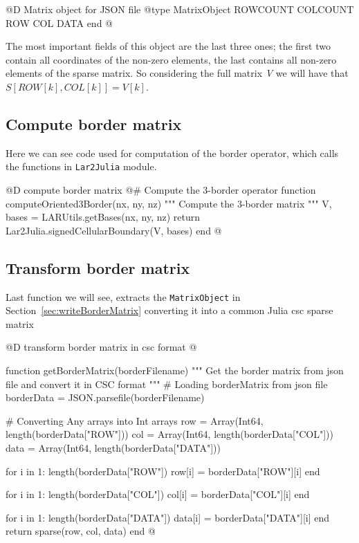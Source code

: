 \documentclass[11pt,oneside]{article}	%
\begin{document}
@D Matrix object for JSON file
@{type MatrixObject
  ROWCOUNT
  COLCOUNT
  ROW
  COL
  DATA
end @}

The most important fields of this object are the last three ones; the first two contain all coordinates of the non-zero elements, the last contains all non-zero elements of the sparse matrix. So considering the full matrix \textit{V} we will have that $S[ROW[k], COL[k]] = V[k]$.

\subsection{Compute border matrix}\label{sec:computeBorder}

Here we can see code used for computation of the border operator, which calls the functions in \texttt{Lar2Julia} module.

@D compute border matrix
@{# Compute the 3-border operator
function computeOriented3Border(nx, ny, nz)
  """
  Compute the 3-border matrix
  """
  V, bases = LARUtils.getBases(nx, ny, nz)
  return Lar2Julia.signedCellularBoundary(V, bases)
end @}

\subsection{Transform border matrix}\label{sec:transformBorder}

Last function we will see, extracts the \texttt{MatrixObject} in Section~\ref{sec:writeBorderMatrix} converting it into a common Julia csc sparse matrix

@D transform border matrix in csc format
@{function getBorderMatrix(borderFilename)
  """
  Get the border matrix from json file and convert it in
  CSC format
  """
  # Loading borderMatrix from json file
  borderData = JSON.parsefile(borderFilename)
  
  # Converting Any arrays into Int arrays
  row = Array(Int64, length(borderData["ROW"]))
  col = Array(Int64, length(borderData["COL"]))
  data = Array(Int64, length(borderData["DATA"]))

  for i in 1: length(borderData["ROW"])
    row[i] = borderData["ROW"][i]
  end

  for i in 1: length(borderData["COL"])
    col[i] = borderData["COL"][i]
  end

  for i in 1: length(borderData["DATA"])
    data[i] = borderData["DATA"][i]
  end
  return sparse(row, col, data)
end @}

\end{document}
